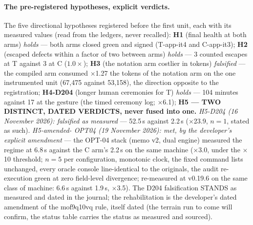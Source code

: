 \documentclass[11pt,a4paper]{article}
\begin{document}
\paragraph{The pre-registered hypotheses, explicit verdicts.} The five
directional hypotheses registered before the first unit, each with its
measured values (read from the ledgers, never recalled): \textbf{H1}
(final health at both arms) \emph{holds} --- both arms closed green
and signed (T-app-it4 and C-app-it3); \textbf{H2} (escaped defects
within a factor of two between arms) \emph{holds} --- 3 counted
escapes at T against 3 at C ($1.0\times$); \textbf{H3} (the notation
arm costlier in tokens) \emph{falsified} --- the compiled arm consumed
$\times$1.27 the tokens of the notation arm on the one instrumented
unit (67{,}475 against 53{,}158), the direction opposite to the
registration; \textbf{H4-D204} (longer human ceremonies for T)
\emph{holds} --- 104 minutes against 17 at the gesture (the timed
ceremony log; $\times$6.1); \textbf{H5 --- TWO DISTINCT, DATED VERDICTS, never fused into one.}
\emph{H5-D204 (16 November 2026): falsified as measured} --- 52.5\,s
against 2.2\,s ($\times$23.9, $n{=}1$, stated as such). \emph{H5-amended-
OPT04 (19 November 2026): met, by the developer's explicit amendment}
--- the OPT-04 stack (memo v2, dual engine) measured the regime at
6.8\,s against the C arm's 2.2\,s on the same machine ($\times$3.0,
under the $\times$10 threshold; $n{=}5$ per configuration, monotonic
clock, the fixed command lists unchanged, every oracle console
line-identical to the originals, the audit re-execution green at zero
field-level divergence; re-measured at v0.19.6 on the same class of
machine: 6.6\,s against 1.9\,s, $\times$3.5). The D204 falsification
STANDS as measured and dated in the journal; the rehabilitation is
the developer's dated amendment of the mof9q10vq rule, itself dated
(the terrain run to come will confirm, the status table
carries the status as measured and sourced).
\end{document}
